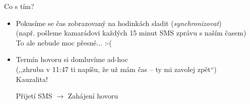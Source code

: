 \documentclass[usenames,dvipsnames,9pt]{beamer}
\begin{document}
\begin{frame}
  \begin{center}
  	\LARGE Co s tím?
  \end{center}
  \vspace{1em}
  \begin{itemize}
  	\pause\item Pokusíme se čas zobrazovaný na hodinkách sladit (\emph{synchronizovat}) \\
  	            {\small (např. pošleme kamarádovi každých 15 minut SMS zprávu s naším časem)} \\[0.4em]

  	            \pause\hfill \textcolor{BrickRed}{To ale nebude moc přesné... :-(} \\[2.2em]

  	\pause\item Termín hovoru si domluvíme ad-hoc \\
  				{\small (,,zhruba v 11:47 ti napíšu, že už mám čas -- ty mi zavolej zpět``)} \\[0.4em]

  	            \pause\hfill {\LARGE Kauzalita!}

                \hfill Přijetí SMS $\rightarrow$ Zahájení hovoru
  \end{itemize}
\end{frame}
\end{document}
